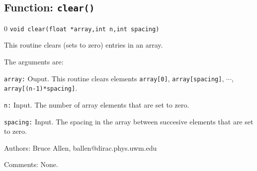 \subsection{Function: {\tt clear()}}
\setcounter{equation}0
{\tt void clear(float *array,int n,int spacing)}

This routine clears (sets to zero) entries in an array.

The arguments are:
\begin{description}
\item{\tt array:} Ouput.  This routine clears
    elements {\tt array[0]}, {\tt array[spacing]}, $\cdots$, 
     {\tt array[(n-1)*spacing]}.
\item{\tt n:} Input.  The number of array elements that are set to zero.
\item{\tt spacing:} Input.  The spacing in the array between succesive
    elements that are set to zero.
\end{description}
\begin{description}
\item{Authors:}
Bruce Allen, ballen@dirac.phys.uwm.edu
\item{Comments:}
None.
\end{description}
\clearpage




